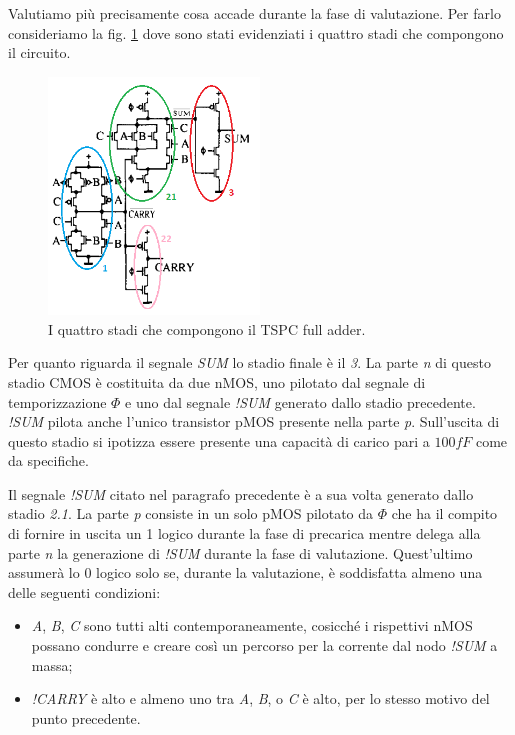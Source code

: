 Valutiamo più precisamente cosa accade durante la fase di valutazione. Per farlo consideriamo la fig. \ref{fig:fig_schemaDaArticoloStadiCerchiati} dove sono stati evidenziati i quattro stadi che compongono il circuito.

\begin{figure}[hbt!]
	\centering
	\includegraphics[width=0.5\textwidth]{figure/SchemaFullAdderTSPC_DaArticolo_ConStadiCerchiati.PNG}
	\caption{I quattro stadi che compongono il TSPC full adder.}
	\label{fig:fig_schemaDaArticoloStadiCerchiati}
\end{figure}

Per quanto riguarda il segnale \textit{SUM} lo stadio finale è il \textit{3}. La parte \textit{n} di questo stadio CMOS è costituita da due nMOS, uno pilotato dal segnale di temporizzazione $\Phi$ e uno dal segnale \textit{!SUM} generato dallo stadio precedente. \textit{!SUM} pilota anche l'unico transistor pMOS presente nella parte \textit{p}. Sull'uscita di questo stadio si ipotizza essere presente una capacità di carico pari a $100 fF$ come da specifiche. 

Il segnale \textit{!SUM} citato nel paragrafo precedente è a sua volta generato dallo stadio \textit{2.1}. La parte \textit{p} consiste in un solo pMOS pilotato da $\Phi$ che ha il compito di fornire in uscita un 1 logico durante la fase di precarica mentre delega alla parte \textit{n} la generazione di \textit{!SUM} durante la fase di valutazione. Quest'ultimo assumerà lo 0 logico solo se, durante la valutazione, è soddisfatta almeno una delle seguenti condizioni:

\begin{itemize}
	\item \textit{A}, \textit{B}, \textit{C} sono tutti alti contemporaneamente, cosicché i rispettivi nMOS possano condurre e creare così un percorso per la corrente dal nodo \textit{!SUM} a massa;
	\item \textit{!CARRY} è alto e almeno uno tra \textit{A}, \textit{B}, o \textit{C} è alto, per lo stesso motivo del punto precedente.
\end{itemize}

